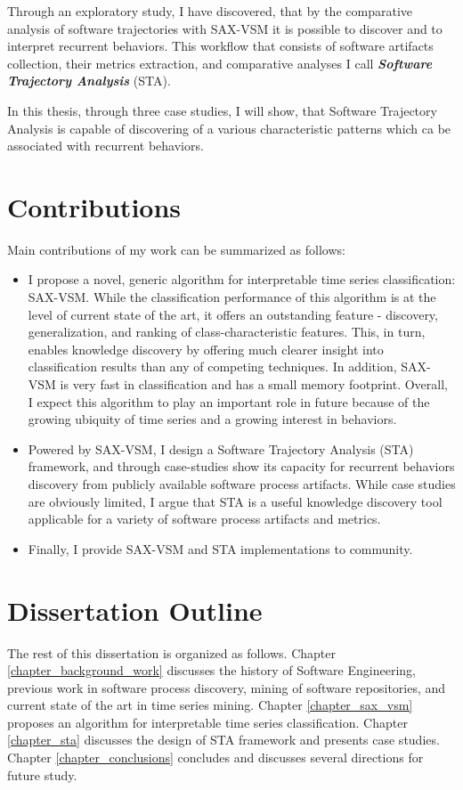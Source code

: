 Through an exploratory study, I have discovered, that by the comparative analysis of software trajectories 
with SAX-VSM it is possible to discover and to interpret recurrent behaviors. This workflow that 
consists of software artifacts collection, their metrics extraction, and comparative analyses I call 
\textit{\textbf{Software Trajectory Analysis}} (STA). 

In this thesis, through three case studies, I will show, that Software Trajectory Analysis is capable 
of discovering of a various characteristic patterns which ca be associated with recurrent behaviors.

\section{Contributions}\label{section_contributions}
Main contributions of my work can be summarized as follows: 
\begin{itemize}
\item I propose a novel, generic algorithm for interpretable time series classification: SAX-VSM. 
While the classification performance of this algorithm is at the level of current state of the art, 
it offers an outstanding feature - discovery, generalization, and ranking of class-characteristic features. 
This, in turn, enables knowledge discovery by offering much clearer insight into classification results than any of 
competing techniques.
In addition, SAX-VSM is very fast in classification and has a small memory footprint. 
Overall, I expect this algorithm to play an important role in future because of the growing ubiquity of time series and 
a growing interest in behaviors.
\item Powered by SAX-VSM, I design a Software Trajectory Analysis (STA) framework, and through case-studies 
show its capacity for recurrent behaviors discovery from publicly available software process
artifacts. While case studies are obviously limited, I argue that STA is a useful knowledge discovery tool applicable for a 
variety of software process artifacts and metrics. 
\item Finally, I provide SAX-VSM and STA implementations to community.
\end{itemize}

\section{Dissertation Outline}\label{section_organization}
The rest of this dissertation is organized as follows. Chapter \ref{chapter_background_work} discusses the history 
of Software Engineering, previous work in software process discovery, mining of software repositories, and current 
state of the art in time series mining. Chapter \ref{chapter_sax_vsm} proposes an algorithm for interpretable 
time series classification. Chapter \ref{chapter_sta} discusses the design of STA framework and presents case studies.
Chapter \ref{chapter_conclusions} concludes and discusses several directions for future study.